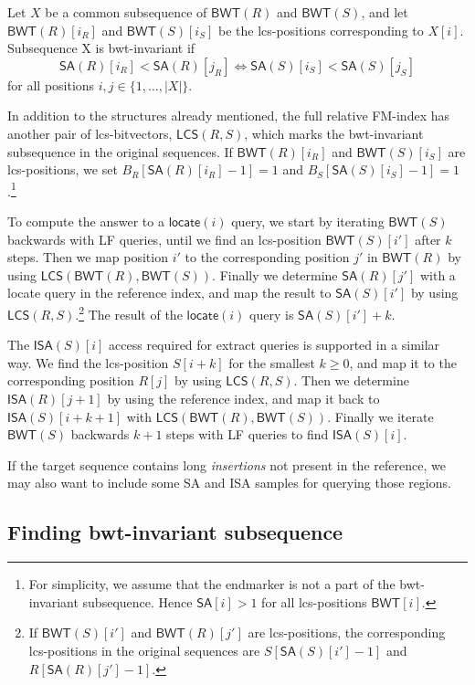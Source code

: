 \documentclass[a4paper,11pt]{llncs}
\newcommand{\set}[1]{\ensuremath{\{ #1 \}}}
\newcommand{\abs}[1]{\ensuremath{\lvert #1 \rvert}}
\newcommand{\SA}{\textsf{SA}}
\newcommand{\ISA}{\textsf{ISA}}
\newcommand{\mSA}{\ensuremath{\mathsf{SA}}}
\newcommand{\mISA}{\ensuremath{\mathsf{ISA}}}
\newcommand{\mBWT}{\ensuremath{\mathsf{BWT}}}
\newcommand{\mLCS}{\ensuremath{\mathsf{LCS}}}
\newcommand{\LF}{\textsf{LF}}
\newcommand{\locate}{\textsf{locate}}
\newcommand{\extract}{\textsf{extract}}
\newcommand{\mlocate}{\ensuremath{\mathsf{locate}}}
\begin{document}
\begin{definition}\label{def:bwt-invariant}
Let $X$ be a common subsequence of $\mBWT(R)$ and $\mBWT(S)$, and let
$\mBWT(R)[i_{R}]$ and $\mBWT(S)[i_{S}]$ be the lcs-positions corresponding to
$X[i]$. Subsequence X is bwt-invariant if
$$
\mSA(R)[i_{R}] < \mSA(R)[j_{R}] \iff \mSA(S)[i_{S}] < \mSA(S)[j_{S}]
$$
for all positions $i, j \in \set{1, \dotsc, \abs{X}}$.
\end{definition}

In addition to the structures already mentioned, the full relative FM-index
has another pair of lcs-bitvectors, $\mLCS(R,S)$, which marks the
bwt-invariant subsequence in the original sequences. If $\mBWT(R)[i_{R}]$ and
$\mBWT(S)[i_{S}]$ are lcs-positions, we set $B_{R}[\mSA(R)[i_{R}]-1] = 1$ and
$B_{S}[\mSA(S)[i_{S}]-1] = 1$.\footnote{For simplicity, we assume that the
endmarker is not a part of the bwt-invariant subsequence. Hence $\mSA[i] > 1$
for all lcs-positions $\mBWT[i]$.} 

To compute the answer to a $\mlocate(i)$ query, we start by iterating
$\mBWT(S)$ backwards with \LF{} queries, until we find an lcs-position
$\mBWT(S)[i']$ after $k$ steps. Then we map position $i'$ to the corresponding
position $j'$ in $\mBWT(R)$ by using $\mLCS(\mBWT(R),\mBWT(S))$. Finally we
determine $\mSA(R)[j']$ with a \locate{} query in the reference index, and map
the result to $\mSA(S)[i']$ by using $\mLCS(R,S)$.\footnote{If $\mBWT(S)[i']$
and $\mBWT(R)[j']$ are lcs-positions, the corresponding lcs-positions in the
original sequences are $S[\mSA(S)[i']-1]$ and $R[\mSA(R)[j']-1]$.} The result
of the $\mlocate(i)$ query is $\mSA(S)[i']+k$.

The $\mISA(S)[i]$ access required for \extract{} queries is supported in a
similar way. We find the lcs-position $S[i+k]$ for the smallest $k \ge 0$, and
map it to the corresponding position $R[j]$ by using $\mLCS(R,S)$. Then we
determine $\mISA(R)[j+1]$ by using the reference index, and map it back to
$\mISA(S)[i+k+1]$ with $\mLCS(\mBWT(R),\mBWT(S))$. Finally we iterate
$\mBWT(S)$ backwards $k+1$ steps with \LF{} queries to find $\mISA(S)[i]$.

If the target sequence contains long
\emph{insertions} not present in the reference, we may also want to include
some \SA{} and \ISA{} samples for querying those regions.

\subsection{Finding bwt-invariant subsequence}
\end{document}
